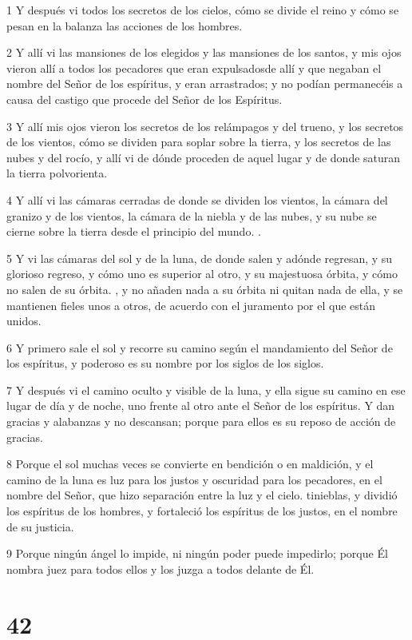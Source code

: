 \par 1 Y después vi todos los secretos de los cielos, cómo se divide el reino y cómo se pesan en la balanza las acciones de los hombres.
\par 2 Y allí vi las mansiones de los elegidos y las mansiones de los santos, y mis ojos vieron allí a todos los pecadores que eran expulsados ​​de allí y que negaban el nombre del Señor de los espíritus, y eran arrastrados; y no podían permanecéis a causa del castigo que procede del Señor de los Espíritus.
\par 3 Y allí mis ojos vieron los secretos de los relámpagos y del trueno, y los secretos de los vientos, cómo se dividen para soplar sobre la tierra, y los secretos de las nubes y del rocío, y allí vi de dónde proceden de aquel lugar y de donde saturan la tierra polvorienta.
\par 4 Y allí vi las cámaras cerradas de donde se dividen los vientos, la cámara del granizo y de los vientos, la cámara de la niebla y de las nubes, y su nube se cierne sobre la tierra desde el principio del mundo. .
\par 5 Y vi las cámaras del sol y de la luna, de donde salen y adónde regresan, y su glorioso regreso, y cómo uno es superior al otro, y su majestuosa órbita, y cómo no salen de su órbita. , y no añaden nada a su órbita ni quitan nada de ella, y se mantienen fieles unos a otros, de acuerdo con el juramento por el que están unidos.
\par 6 Y primero sale el sol y recorre su camino según el mandamiento del Señor de los espíritus, y poderoso es su nombre por los siglos de los siglos.
\par 7 Y después vi el camino oculto y visible de la luna, y ella sigue su camino en ese lugar de día y de noche, uno frente al otro ante el Señor de los espíritus. Y dan gracias y alabanzas y no descansan; porque para ellos es su reposo de acción de gracias.
\par 8 Porque el sol muchas veces se convierte en bendición o en maldición, y el camino de la luna es luz para los justos y oscuridad para los pecadores, en el nombre del Señor, que hizo separación entre la luz y el cielo. tinieblas, y dividió los espíritus de los hombres, y fortaleció los espíritus de los justos, en el nombre de su justicia.
\par 9 Porque ningún ángel lo impide, ni ningún poder puede impedirlo; porque Él nombra juez para todos ellos y los juzga a todos delante de Él.

\chapter{42}

